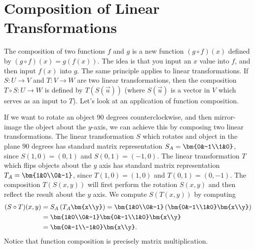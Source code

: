 \section{Composition of Linear Transformations}
The composition of two functions $f$ and $g$ is a new function $(g\circ f)(x)$ defined by $(g\circ f)(x) = g(f(x))$.  The idea is that you input an $x$ value into $f$, and then input $f(x)$ into $g$.  The same principle applies to linear transformations.  If $S\colon U\to V$ and $T\colon V\to W$ are two linear transformations, then the composition $T\circ S\colon U\to W$ is defined by $T(S(\vec u))$ (where $S(\vec u)$ is a vector in $V$ which serves as an input to $T$). Let's look at an application of function composition. 

\begin{example}
If we want to rotate an object 90 degrees counterclockwise, and then mirror-image the object about the $y$-axis, we can achieve this by composing two linear transformations. %
The linear transformation $S$ which rotates and object in the plane 90 degrees has standard matrix representation $S_A = \bm{0&-1\\1&0}$, since $S(1,0) = (0,1)$ and $S(0,1)=(-1,0)$.  
The linear transformation $T$ which flips objects about the $y$ axis has standard matrix representation $T_A = \bm{1&0\\0&-1}$, since $T(1,0)=(1,0)$ and $T(0,1)=(0,-1)$.  The composition $T(S(x,y))$ will first perform the rotation $S(x,y)$ and then reflect the result about the $y$ axis. We compute $S(T(x,y))$ by computing 
\begin{align*}
  (S\circ T)(x,y)&=S_A\left(T_A\bm{x\\y}\right) = \bm{1&0\\0&-1}\left(\bm{0&-1\\1&0}\bm{x\\y}\right) \\
  &= \bm{1&0\\0&-1}\bm{0&-1\\1&0}\bm{x\\y}\\
  &=\bm{0&-1\\-1&0}\bm{x\\y}.
\end{align*}
Notice that function composition is precisely matrix multiplication.
\end{example}


